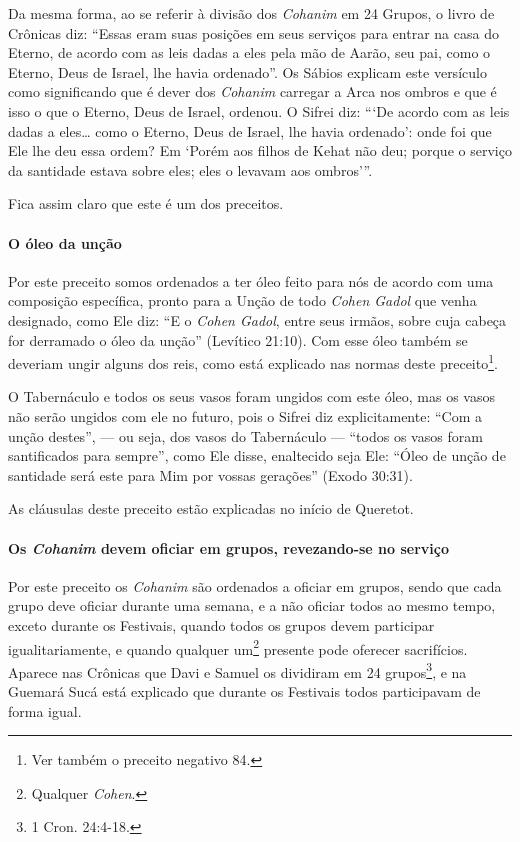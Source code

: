 Da mesma forma, ao se referir à divisão dos \textit{Cohanim} em 24 Grupos, o
livro de Crônicas diz: ``Essas eram suas posições em seus serviços para
entrar na casa do Eterno, de acordo com as leis dadas a eles pela mão de
Aarão, seu pai, como o Eterno, Deus de Israel, lhe havia ordenado''. Os
Sábios explicam este versículo como significando que é dever dos
\textit{Cohanim} carregar a Arca nos ombros e que é isso o que o Eterno, Deus
de Israel, ordenou. O Sifrei diz: ```De acordo com as leis dadas a eles\ldots{}
como o Eterno, Deus de Israel, lhe havia ordenado': onde foi que
Ele lhe deu essa ordem? Em `Porém aos filhos de Kehat não deu; porque o
serviço da santidade estava sobre eles; eles o levavam aos ombros'''.

Fica assim claro que este é um dos preceitos.

\paragraph{O óleo da unção}

Por este preceito somos ordenados a ter óleo feito para nós de acordo
com uma composição específica, pronto para a Unção de todo \textit{Cohen Gadol} que venha designado, como Ele diz: ``E o \textit{Cohen Gadol}, entre seus
irmãos, sobre cuja cabeça for derramado o óleo da unção'' (Levítico
21:10). Com esse óleo também se deveriam ungir alguns dos reis, como
está explicado nas normas deste preceito\footnote{Ver também o preceito negativo 84.}.

O Tabernáculo e todos os seus vasos foram ungidos com este óleo,
mas os vasos não serão ungidos com ele no futuro, pois o Sifrei diz
explicitamente: ``Com a unção destes'', --- ou seja, dos vasos do
Tabernáculo --- ``todos os vasos foram santificados para sempre'', como
Ele disse, enaltecido seja Ele: ``Óleo de unção de santidade será este
para Mim por vossas gerações'' (Exodo 30:31).

As cláusulas deste preceito estão explicadas no início de Queretot.

\paragraph{Os \textit{Cohanim} devem oficiar em grupos, revezando-se no serviço}

Por este preceito os \textit{Cohanim} são ordenados a oficiar em grupos,
sendo que cada grupo deve oficiar durante uma semana, e a não oficiar
todos ao mesmo tempo, exceto durante os Festivais, quando todos os grupos
devem participar igualitariamente, e quando qualquer
um\footnote{Qualquer \textit{Cohen}.} presente pode oferecer sacrifícios. Aparece nas Crônicas que Davi e Samuel os dividiram em 24 grupos\footnote{1 Cron. 24:4-18.},
e na Guemará Sucá está explicado que durante os Festivais todos
participavam de forma igual.

